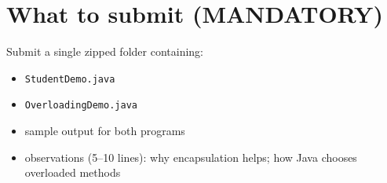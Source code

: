 \documentclass[11pt]{article}
\begin{document}
\section{What to submit (MANDATORY)}
Submit a single zipped folder containing:
\begin{itemize}[leftmargin=*]
  \item \texttt{StudentDemo.java}
  \item \texttt{OverloadingDemo.java}
  \item sample output for both programs
  \item observations (5--10 lines): why encapsulation helps; how Java chooses overloaded methods
\end{itemize}

\notesources{\OOPSUnitIISources}
\end{document}
